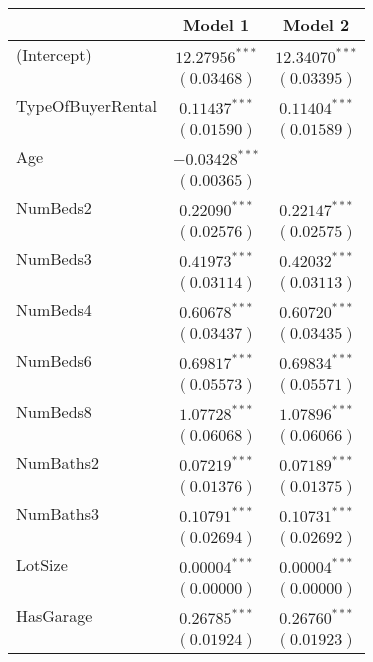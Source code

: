 
\begin{table}
\begin{center}
\begin{tabular}{l c c}
\hline
 & Model 1 & Model 2 \\
\hline
(Intercept)       & $12.27956^{***}$ & $12.34070^{***}$ \\
                  & $(0.03468)$      & $(0.03395)$      \\
TypeOfBuyerRental & $0.11437^{***}$  & $0.11404^{***}$  \\
                  & $(0.01590)$      & $(0.01589)$      \\
Age               & $-0.03428^{***}$ &                  \\
                  & $(0.00365)$      &                  \\
NumBeds2          & $0.22090^{***}$  & $0.22147^{***}$  \\
                  & $(0.02576)$      & $(0.02575)$      \\
NumBeds3          & $0.41973^{***}$  & $0.42032^{***}$  \\
                  & $(0.03114)$      & $(0.03113)$      \\
NumBeds4          & $0.60678^{***}$  & $0.60720^{***}$  \\
                  & $(0.03437)$      & $(0.03435)$      \\
NumBeds6          & $0.69817^{***}$  & $0.69834^{***}$  \\
                  & $(0.05573)$      & $(0.05571)$      \\
NumBeds8          & $1.07728^{***}$  & $1.07896^{***}$  \\
                  & $(0.06068)$      & $(0.06066)$      \\
NumBaths2         & $0.07219^{***}$  & $0.07189^{***}$  \\
                  & $(0.01376)$      & $(0.01375)$      \\
NumBaths3         & $0.10791^{***}$  & $0.10731^{***}$  \\
                  & $(0.02694)$      & $(0.02692)$      \\
LotSize           & $0.00004^{***}$  & $0.00004^{***}$  \\
                  & $(0.00000)$      & $(0.00000)$      \\
HasGarage         & $0.26785^{***}$  & $0.26760^{***}$  \\
                  & $(0.01924)$      & $(0.01923)$      \\

\end{tabular}
\end{center}
\end{table}
